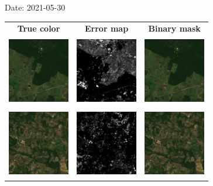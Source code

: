 \documentclass{beamer}
\begin{document}
\begin{frame}{Date: 2021-05-30}
    \begin{tabular}{ccc}
        \textbf{True color} & \textbf{Error map} & \textbf{Binary mask}\\
        \includegraphics[width=2.7cm,height=3cm]{Figures/v6/20210530/TCI_zoom5.png}& \includegraphics[width=2.7cm,height=3cm]{Figures/v6/20210530/error_map_zoom5.png} &\includegraphics[width=2.7cm,height=3cm]{Figures/v6/20210530/zoom5_BI.png}\\
        \includegraphics[width=2.7cm,height=3cm]{Figures/v6/20210530/TCI_zoom6.png}& \includegraphics[width=2.7cm,height=3cm]{Figures/v6/20210530/error_map_zoom6.png} &\includegraphics[width=2.7cm,height=3cm]{Figures/v6/20210530/zoom6_BI.png}\\
        \end{tabular}
\end{frame}
\end{document}

